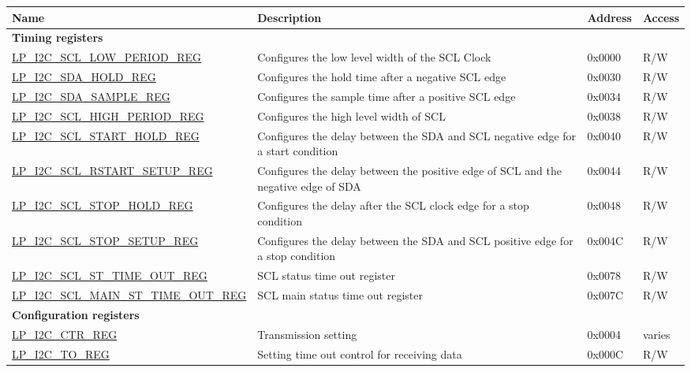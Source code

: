 \begin{longtable}{ | p{6cm} | p{7.2cm} | p{1.3cm} | p{1cm} | }
\hline\rowcolor{lightgray}
Name & Description &  Address & Access \\ \hline
\endhead
\multicolumn{4}{|l|}{\textbf{Timing registers}} \\ \hline
\hyperref[regdesc:LPI2CSCLLOWPERIODREG]{LP\_I2C\_SCL\_LOW\_PERIOD\_REG} & Configures the low level width of the SCL Clock & 0x0000 & R/W \\ \hline
\hyperref[regdesc:LPI2CSDAHOLDREG]{LP\_I2C\_SDA\_HOLD\_REG} & Configures the hold time after a negative SCL edge & 0x0030 & R/W \\ \hline
\hyperref[regdesc:LPI2CSDASAMPLEREG]{LP\_I2C\_SDA\_SAMPLE\_REG} & Configures the sample time after a positive SCL edge & 0x0034 & R/W \\ \hline
\hyperref[regdesc:LPI2CSCLHIGHPERIODREG]{LP\_I2C\_SCL\_HIGH\_PERIOD\_REG} & Configures the high level width of SCL & 0x0038 & R/W \\ \hline
\hyperref[regdesc:LPI2CSCLSTARTHOLDREG]{LP\_I2C\_SCL\_START\_HOLD\_REG} & Configures the delay between the SDA and SCL negative edge for a start condition & 0x0040 & R/W \\ \hline
\hyperref[regdesc:LPI2CSCLRSTARTSETUPREG]{LP\_I2C\_SCL\_RSTART\_SETUP\_REG} & Configures the delay between the positive edge of SCL and the negative edge of SDA & 0x0044 & R/W \\ \hline
\hyperref[regdesc:LPI2CSCLSTOPHOLDREG]{LP\_I2C\_SCL\_STOP\_HOLD\_REG} & Configures the delay after the SCL clock edge for a stop condition & 0x0048 & R/W \\ \hline
\hyperref[regdesc:LPI2CSCLSTOPSETUPREG]{LP\_I2C\_SCL\_STOP\_SETUP\_REG} & Configures the delay between the SDA and SCL positive edge for a stop condition & 0x004C & R/W \\ \hline
\hyperref[regdesc:LPI2CSCLSTTIMEOUTREG]{LP\_I2C\_SCL\_ST\_TIME\_OUT\_REG} & SCL status time out register & 0x0078 & R/W \\ \hline
\hyperref[regdesc:LPI2CSCLMAINSTTIMEOUTREG]{LP\_I2C\_SCL\_MAIN\_ST\_TIME\_OUT\_REG} & SCL main status time out register & 0x007C & R/W \\ \hline
\multicolumn{4}{|l|}{\textbf{Configuration registers}} \\ \hline
\hyperref[regdesc:LPI2CCTRREG]{LP\_I2C\_CTR\_REG} & Transmission setting & 0x0004 & varies \\ \hline
\hyperref[regdesc:LPI2CTOREG]{LP\_I2C\_TO\_REG} & Setting time out control for receiving data & 0x000C & R/W \\ \hline

\end{longtable}
